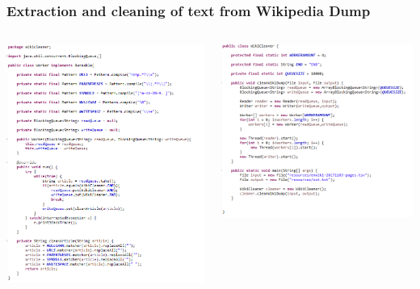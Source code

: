 \documentclass{beamer}
\begin{document}

\begin{frame}
\frametitle{Extraction and cleaning of text from Wikipedia Dump}
\begin{columns}[c] %

\includegraphics[scale=0.35]{Worker.PNG}

\includegraphics[scale=0.4]{WikiCleaner.PNG}

\end{columns}
\end{frame}
\end{document}
